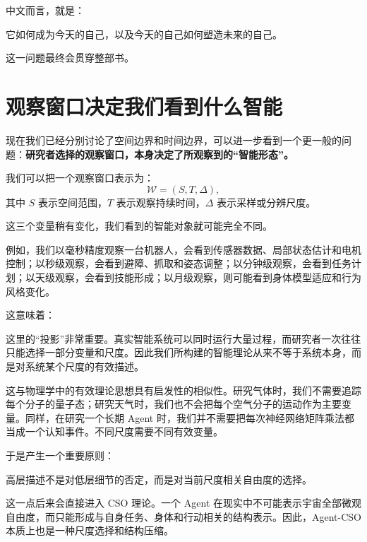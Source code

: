 中文而言，就是：

\begin{statementbox}
它如何成为今天的自己，以及今天的自己如何塑造未来的自己。
\end{statementbox}

这一问题最终会贯穿整部书。

\section{观察窗口决定我们看到什么智能}

现在我们已经分别讨论了空间边界和时间边界，可以进一步看到一个更一般的问题：\textbf{研究者选择的观察窗口，本身决定了所观察到的“智能形态”。}

我们可以把一个观察窗口表示为：
\[
\mathcal W=(S,T,\Delta),
\]
其中 \(S\) 表示空间范围，\(T\) 表示观察持续时间，\(\Delta\) 表示采样或分辨尺度。

这三个变量稍有变化，我们看到的智能对象就可能完全不同。

例如，我们以毫秒精度观察一台机器人，会看到传感器数据、局部状态估计和电机控制；以秒级观察，会看到避障、抓取和姿态调整；以分钟级观察，会看到任务计划；以天级观察，会看到技能形成；以月级观察，则可能看到身体模型适应和行为风格变化。

这意味着：
\begin{statementbox}
\centering
{}
\end{statementbox}

这里的“投影”非常重要。真实智能系统可以同时运行大量过程，而研究者一次往往只能选择一部分变量和尺度。因此我们所构建的智能理论从来不等于系统本身，而是对系统某个尺度的有效描述。

这与物理学中的有效理论思想具有启发性的相似性。研究气体时，我们不需要追踪每个分子的量子态；研究天气时，我们也不会把每个空气分子的运动作为主要变量。同样，在研究一个长期 Agent 时，我们并不需要把每次神经网络矩阵乘法都当成一个认知事件。不同尺度需要不同有效变量。

于是产生一个重要原则：
\begin{proposition*}
高层描述不是对低层细节的否定，而是对当前尺度相关自由度的选择。
\end{proposition*}

这一点后来会直接进入 CSO 理论。一个 Agent 在现实中不可能表示宇宙全部微观自由度，而只能形成与自身任务、身体和行动相关的结构表示。因此，Agent-CSO 本质上也是一种尺度选择和结构压缩。

